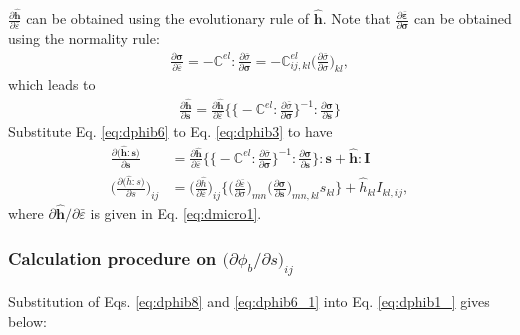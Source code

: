 \documentclass[12pt]{amsart}
\begin{document}
$\frac{\partial{\hat{\mathbf{h}}}}{\partial{\bar{\varepsilon}}} $ can be obtained using the evolutionary rule of $\hat{\mathbf{h}}$.
Note that $\frac{\partial{\bar{\mathbf{\varepsilon}}}}{\partial{\mathbf{\sigma}}}$ can be obtained using the normality rule:
\begin{eqnarray}
  \label{eq:dphib5}
  \frac{\partial{\mathbf{\sigma}}}{\partial{\bar{\varepsilon}}} = - \mathbb{C}^{el} : \frac{\partial{\bar{\sigma}}}{\partial{\mathbf{\sigma}}} = -\mathbb{C}^{el}_{ij,kl} \bigg(\frac{\partial\bar{\sigma}}{\partial\sigma}\bigg)_{kl},
\end{eqnarray}
which leads to
\begin{eqnarray}
  \label{eq:dphib6}
\frac{\partial{\hat{\mathbf{h}}}}{\partial{\mathbf{s}}}=\frac{\partial{\hat{\mathbf{h}}}}{\partial{\bar{\varepsilon}}} \bigg\{ \Big\{- \mathbb{C}^{el} : \frac{\partial{\bar{\sigma}}}{\partial{\mathbf{\sigma}}}\Big\}^{-1} :  \frac{\partial{\mathbf{\sigma}}}{\partial{\mathbf{s}}}\bigg\}
\end{eqnarray}
Substitute Eq. \ref{eq:dphib6} to Eq. \ref{eq:dphib3} to have
\begin{equation}
  \label{eq:dphib6_1}
  \begin{split}
    \frac{\partial \big(\hat{\mathbf{h}}:\mathbf{s}\big)  }{\partial\mathbf{s}}&=\frac{\partial{\hat{\mathbf{h}}}}{\partial{\bar{\varepsilon}}}  \bigg\{ \Big\{- \mathbb{C}^{el} : \frac{\partial{\bar{\sigma}}}{\partial{\mathbf{\sigma}}}\Big\}^{-1} :  \frac{\partial{\mathbf{\sigma}}}{\partial{\mathbf{s}}}\bigg\}:\mathbf{s} + \hat{\mathbf{h}}:\mathbf{I}\\
    \bigg(\frac{\partial \big(\hat{h}:s\big)  }{\partial s}\bigg)_{ij} & = \bigg(\frac{\partial\hat{h}}{\partial\bar{\varepsilon}}\bigg)_{ij} \bigg\{\bigg(\frac{\partial\bar{\varepsilon}}{\partial\sigma}\bigg)_{mn}  \bigg(\frac{\partial{\mathbf{\sigma}}}{\partial{\mathbf{s}}}\bigg)_{mn,kl} s_{kl}\bigg\} + \hat{h}_{kl}I_{kl,ij},
  \end{split}
\end{equation}
where $\partial \hat{\mathbf{h}}/ \partial\bar{\varepsilon}$ is given in Eq. \ref{eq:dmicro1}.


\subsubsection{Calculation procedure on $\big(\partial\phi_b/\partial s\big)_{ij}$}
\label{sec:calc}


Substitution of Eqs. \ref{eq:dphib8} and \ref{eq:dphib6_1} into Eq. \ref{eq:dphib1_} gives below:
\end{document}
